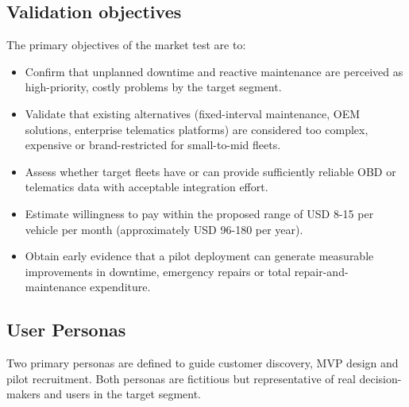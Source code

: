 \documentclass[11pt,a4paper]{article}
\begin{document}
\subsection{Validation objectives}
\noindent The primary objectives of the market test are to:
\begin{itemize}
    \item Confirm that unplanned downtime and reactive maintenance are perceived as high-priority, costly problems by the target segment.
    \item Validate that existing alternatives (fixed-interval maintenance, OEM solutions, enterprise telematics platforms) are considered too complex, expensive or brand-restricted for small-to-mid fleets.
    \item Assess whether target fleets have or can provide sufficiently reliable OBD or telematics data with acceptable integration effort.
    \item Estimate willingness to pay within the proposed range of USD 8-15 per vehicle per month (approximately USD 96-180 per year).
    \item Obtain early evidence that a pilot deployment can generate measurable improvements in downtime, emergency repairs or total repair-and-maintenance expenditure.
\end{itemize}

\subsection{User Personas}
\indent Two primary personas are defined to guide customer discovery, MVP design and pilot recruitment. Both personas are fictitious but representative of real decision-makers and users in the target segment.
\end{document}
